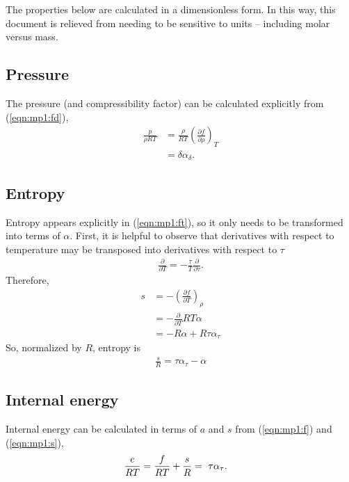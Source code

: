 The properties below are calculated in a dimensionless form.  In this way, this document is relieved from needing to be sensitive to units -- including molar versus mass. 
 
\subsection{Pressure}\label{sec:mp1:p}

The pressure (and compressibility factor) can be calculated explicitly from (\ref{eqn:mp1:fd}),
\begin{align}
\frac{p}{\rho R T} &=  \frac{\rho}{R T}\left(\frac{\partial f}{\partial \rho}\right)_T\nonumber\\
&= \delta \alpha_\delta\label{eqn:mp1:p}.
\end{align}

\subsection{Entropy}\label{sec:mp1:s}

Entropy appears explicitly in (\ref{eqn:mp1:ft}), so it only needs to be transformed into terms of $\alpha$.  First, it is helpful to observe that derivatives with respect to temperature may be transposed into derivatives with respect to $\tau$ 
\begin{align}
\frac{\partial}{\partial T} = -\frac{\tau}{T} \frac{\partial}{\partial \tau}.\nonumber
\end{align}
Therefore, 
\begin{align}
s &= -\left(\frac{\partial f}{\partial T}\right)_\rho \nonumber\\
&= -\frac{\partial}{\partial T} R T \alpha\nonumber\\
&= -R \alpha + R \tau \alpha_\tau
\end{align}
So, normalized by $R$, entropy is
\begin{align}
\frac{s}{R} = \tau \alpha_\tau - \alpha\label{eqn:mp1:s}
\end{align}

\subsection{Internal energy}\label{sec:mp1:e}

Internal energy can be calculated in terms of $a$ and $s$ from (\ref{eqn:mp1:f}) and (\ref{eqn:mp1:s}),
\begin{align}
\frac{e}{R T} &= \frac{f}{RT} + \frac{s}{R} \vspace{2em} =\ \tau \alpha_\tau\label{eqn:mp1:e}.
\end{align}


